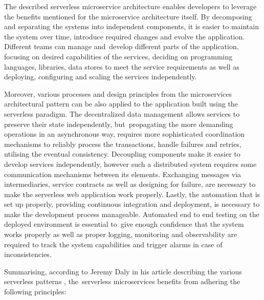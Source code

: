 The described serverless microservice architecture enables developers to leverage the benefits mentioned for the microservice architecture itself.
By decomposing and separating the systems into independent components, it is easier to maintain the system over time, introduce required changes and evolve the application. Different teams can manage and~develop different parts of the application, focusing on desired capabilities of the services, deciding on programming languages, libraries, data stores to meet the service requirements as well as deploying, configuring and scaling the services independently.

Moreover, various processes and design principles from the microservices architectural pattern can be also applied to the application built using the serverless paradigm.
The decentralized data management allows services to preserve their state independently, but~propagating the more demanding operations in an asynchronous way, requires more sophisticated coordination mechanisms to reliably process the transactions, handle failures and retries, utilising the eventual consistency.
Decoupling components make it easier to develop services independently, however such a distributed system requires some communication mechanisms between its elements.
Exchanging messages via intermediaries, service contracts as well as designing for failure, are necessary to make the serverless web application work properly.
Lastly, the automation that is set up properly, providing continuous integration and deployment, is necessary to make the development process manageable.
Automated end to end testing on the deployed environment is essential to~give enough confidence that the system works properly as well as proper logging, monitoring and observability are required to track the system capabilities and trigger alarms in case of inconsistencies. \newline \newline


Summarising, according to Jeremy Daly in his article describing the various serverless patterns \cite{ServerlessMicroservicePatternsForAWS}, the~serverless microservices benefits from adhering the following principles:


